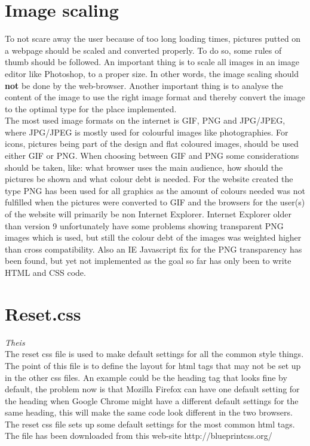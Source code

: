 \section{Image scaling}
To not scare away the user because of too long loading times, pictures putted on a webpage should be scaled and converted properly. To do so, some rules of thumb should be followed. An important thing is to scale all images in an image editor like Photoshop, to a proper size. In other words, the image scaling should \textbf{not} be done by the web-browser. Another important thing is to analyse the content of the image to use the right image format and thereby convert the image to the optimal type for the place implemented.
\\The most used image formats on the internet is GIF, PNG and JPG/JPEG, where JPG/JPEG is mostly used for colourful images like photographies. For icons, pictures being part of the design and flat coloured images, should be used either GIF or PNG. When choosing between GIF and PNG some considerations should be taken, like: what browser uses the main audience, how should the pictures be shown and what colour debt is needed. For the website created the type PNG has been used for all graphics as the amount of colours needed was not fulfilled when the pictures were converted to GIF and the browsers for the user(s) of the website will primarily be non Internet Explorer. Internet Explorer older than version 9 unfortunately have some problems showing transparent PNG images which is used, but still the colour debt of the images was weighted higher than cross compatibility. Also an IE Javascript fix for the PNG transparency has been found, but yet not implemented as the goal so far has only been to write HTML and CSS code. 

\section{Reset.css} \textit{Theis}\\
The reset css file is used to make default settings for all the common style things. The point of this file is to define the layout for html tags that may not be set up in the other css files. An example could be the heading tag that looks fine by default, the problem now is that Mozilla Firefox can have one default setting for the heading when Google Chrome might have a different default settings for the same heading, this will make the same code look different in the two browsers. The reset css file sets up some default settings for the most common html tags. The file has been downloaded from this web-site http://blueprintcss.org/
